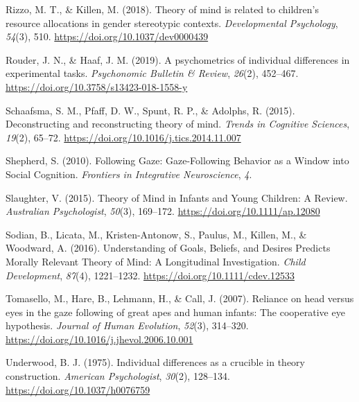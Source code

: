 \documentclass[
  man,floatsintext]{apa6}
\newlength{\cslhangindent}
\newlength{\cslentryspacingunit} %
\newenvironment{CSLReferences}[2] %
 {%
  \setlength{\parindent}{0pt}
  \ifodd #1
  \let\oldpar\par
  \def\par{\hangindent=\cslhangindent\oldpar}
  \fi
  \setlength{\parskip}{#2\cslentryspacingunit}
 }%
 {}
\begin{document}
\begin{CSLReferences}{1}{0}
\leavevmode{}%
Rizzo, M. T., \& Killen, M. (2018). Theory of mind is related to children's resource allocations in gender stereotypic contexts. \emph{Developmental Psychology}, \emph{54}(3), 510. \url{https://doi.org/10.1037/dev0000439}

\leavevmode{}%
Rouder, J. N., \& Haaf, J. M. (2019). A psychometrics of individual differences in experimental tasks. \emph{Psychonomic Bulletin \& Review}, \emph{26}(2), 452--467. \url{https://doi.org/10.3758/s13423-018-1558-y}

\leavevmode{}%
Schaafsma, S. M., Pfaff, D. W., Spunt, R. P., \& Adolphs, R. (2015). Deconstructing and reconstructing theory of mind. \emph{Trends in Cognitive Sciences}, \emph{19}(2), 65--72. \url{https://doi.org/10.1016/j.tics.2014.11.007}

\leavevmode{}%
Shepherd, S. (2010). Following {Gaze}: {Gaze-Following Behavior} as a {Window} into {Social Cognition}. \emph{Frontiers in Integrative Neuroscience}, \emph{4}.

\leavevmode{}%
Slaughter, V. (2015). Theory of {Mind} in {Infants} and {Young Children}: {A Review}. \emph{Australian Psychologist}, \emph{50}(3), 169--172. \url{https://doi.org/10.1111/ap.12080}

\leavevmode{}%
Sodian, B., Licata, M., Kristen-Antonow, S., Paulus, M., Killen, M., \& Woodward, A. (2016). Understanding of {Goals}, {Beliefs}, and {Desires Predicts Morally Relevant Theory} of {Mind}: {A Longitudinal Investigation}. \emph{Child Development}, \emph{87}(4), 1221--1232. \url{https://doi.org/10.1111/cdev.12533}

\leavevmode{}%
Tomasello, M., Hare, B., Lehmann, H., \& Call, J. (2007). Reliance on head versus eyes in the gaze following of great apes and human infants: The cooperative eye hypothesis. \emph{Journal of Human Evolution}, \emph{52}(3), 314--320. \url{https://doi.org/10.1016/j.jhevol.2006.10.001}

\leavevmode{}%
Underwood, B. J. (1975). Individual differences as a crucible in theory construction. \emph{American Psychologist}, \emph{30}(2), 128--134. \url{https://doi.org/10.1037/h0076759}


\end{CSLReferences}
\end{document}
